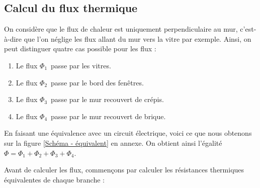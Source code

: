 \documentclass[12pt, a4paper]{article}
\newcommand{\phiUn}{\ensuremath{\Phi_{1}}}
\newcommand{\phiDeux}{\ensuremath{\Phi_{2}}}
\newcommand{\phiTrois}{\ensuremath{\Phi_{3}}}
\newcommand{\phiQuatre}{\ensuremath{\Phi_{4}}}
\begin{document}
\subsection{Calcul du flux thermique}

On considère que le flux de chaleur est uniquement perpendiculaire au mur, c'est-à-dire que l'on néglige les flux allant du mur vers la vitre par exemple. Ainsi, on peut distinguer quatre cas possible pour les flux :

\begin{enumerate}
\item Le flux \phiUn\ passe par les vitres.
\item Le flux \phiDeux\ passe par le bord des fenêtres.
\item Le flux \phiTrois\ passe par le mur recouvert de crépis.
\item Le flux \phiQuatre\ passe par le mur recouvert de brique.
\end{enumerate}

En faisant une équivalence avec un circuit électrique, voici ce que nous obtenons sur la figure \ref{Schéma - équivalent} en annexe. On obtient ainsi l'égalité $\Phi = \phiUn + \phiDeux + \phiTrois + \phiQuatre$.

Avant de calculer les flux, commençons par calculer les résistances thermiques équivalentes de chaque branche : 

\bigskip
\end{document}
